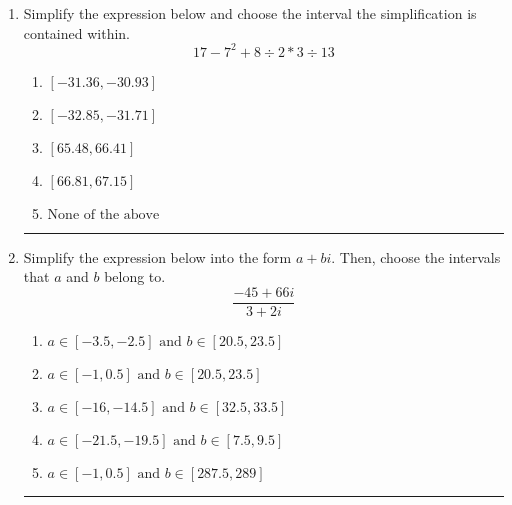 \documentclass[14pt]{extbook}
\newcommand{\litem}[1]{\item#1\hspace*{-1cm}\rule{\textwidth}{0.4pt}}
\begin{document}
\begin{enumerate}
{\begin{enumerate}[label=\Alph*.]
\end{enumerate} }
\litem{
Simplify the expression below and choose the interval the simplification is contained within.\[ 17 - 7^2 + 8 \div 2 * 3 \div 13 \]\begin{enumerate}[label=\Alph*.]
\item \( [-31.36, -30.93] \)
\item \( [-32.85, -31.71] \)
\item \( [65.48, 66.41] \)
\item \( [66.81, 67.15] \)
\item \( \text{None of the above} \)

\end{enumerate} }
\litem{
Simplify the expression below into the form $a+bi$. Then, choose the intervals that $a$ and $b$ belong to.\[ \frac{-45 + 66 i}{3 + 2 i} \]\begin{enumerate}[label=\Alph*.]
\item \( a \in [-3.5, -2.5] \text{ and } b \in [20.5, 23.5] \)
\item \( a \in [-1, 0.5] \text{ and } b \in [20.5, 23.5] \)
\item \( a \in [-16, -14.5] \text{ and } b \in [32.5, 33.5] \)
\item \( a \in [-21.5, -19.5] \text{ and } b \in [7.5, 9.5] \)
\item \( a \in [-1, 0.5] \text{ and } b \in [287.5, 289] \)

\end{enumerate} }
\end{enumerate}
\end{document}

